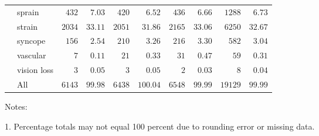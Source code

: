 \documentclass[9pt, oneside]{article}   	%
\begin{document}
\begin{longtable}{p{1.8in}p{2.2in}cccccccc}
 & sprain  & $\phantom{0}432$ & $\phantom{0}7.03$ & $\phantom{0}420$ & $\phantom{00}6.52$ & $\phantom{0}436$ & $\phantom{0}6.66$ & $\phantom{0}1288$ & $\phantom{0}6.73$ \\
 & strain  & $2034$ & $33.11$ & $2051$ & $\phantom{0}31.86$ & $2165$ & $33.06$ & $\phantom{0}6250$ & $32.67$ \\
 & syncope  & $\phantom{0}156$ & $\phantom{0}2.54$ & $\phantom{0}210$ & $\phantom{00}3.26$ & $\phantom{0}216$ & $\phantom{0}3.30$ & $\phantom{00}582$ & $\phantom{0}3.04$ \\
 & vascular  & $\phantom{000}7$ & $\phantom{0}0.11$ & $\phantom{00}21$ & $\phantom{00}0.33$ & $\phantom{00}31$ & $\phantom{0}0.47$ & $\phantom{000}59$ & $\phantom{0}0.31$ \\
 & vision loss  & $\phantom{000}3$ & $\phantom{0}0.05$ & $\phantom{000}3$ & $\phantom{00}0.05$ & $\phantom{000}2$ & $\phantom{0}0.03$ & $\phantom{0000}8$ & $\phantom{0}0.04$ \\
\cline{1-1} \cline{2-2} \cline{3-3} \cline{4-4} \cline{5-5} \cline{6-6} \cline{7-7} \cline{8-8} \cline{9-9} \cline{10-10} %
 & All  & $6143$ & $99.98$ & $6438$ & $100.04$ & $6548$ & $99.99$ & $19129$ & $99.99$ \\
\hline 
\end{longtable}


    \begin{tablenotes}
      \small
      Notes:
      \\
      \item 1. Percentage totals may not equal 100 percent due to rounding error or missing data.\\
      \end{tablenotes}

\pagebreak
\end{document}
